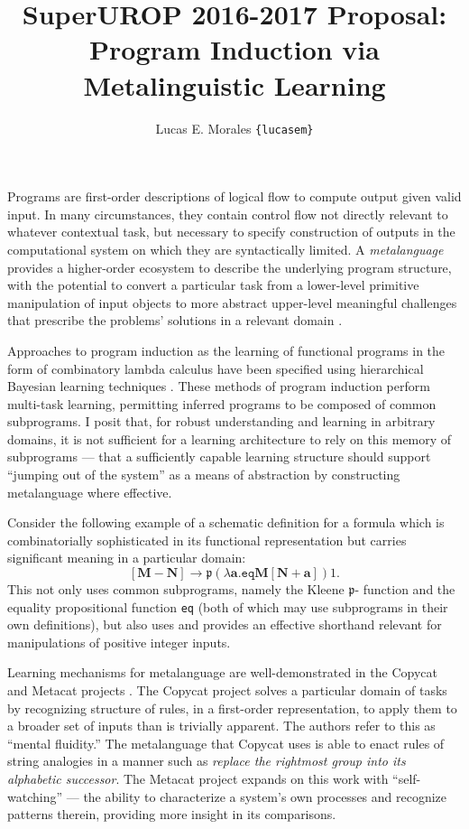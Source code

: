\documentclass[11pt,letterpaper]{article}
\title{{\large SuperUROP 2016-2017 Proposal:}\\
  {\Large Program Induction via Metalinguistic Learning}}
\author{Lucas E. Morales \texttt{\{lucasem\}}}
\date{}
\begin{document}
\maketitle

Programs are first-order descriptions of logical flow to compute output
given valid input. In many circumstances, they contain control flow not
directly relevant to whatever contextual task, but necessary to specify
construction of outputs in the computational system on which they are
syntactically limited. A \emph{metalanguage} provides a higher-order
ecosystem to describe the underlying program structure, with the potential
to convert a particular task from a lower-level primitive manipulation of
input objects to more abstract upper-level meaningful challenges that
prescribe the problems' solutions in a relevant domain \cite{sicp}.

Approaches to program induction as the learning of functional programs in
the form of combinatory lambda calculus have been specified using
hierarchical Bayesian learning techniques \cite{dechter,liang}. These
methods of program induction perform multi-task learning, permitting
inferred programs to be composed of common subprograms. I posit that, for
robust understanding and learning in arbitrary domains, it is not sufficient
for a learning architecture to rely on this memory of subprograms --- that a
sufficiently capable learning structure should support ``jumping out of the
system'' as a means of abstraction by constructing metalanguage where
effective.

Consider the following example of a schematic definition for a formula
\cite{church} which is combinatorially sophisticated in its functional
representation but carries significant meaning in a particular domain:
\[\mathbf{[M-N]} \rightarrow \mathfrak{p} (\lambda\mathbf{a}.
  \texttt{eq} \mathbf{M} \mathbf{[N+a]})1.\]
This not only uses common subprograms, namely the Kleene $\mathfrak{p}$-%
function and the equality propositional function \texttt{eq} (both of which
may use subprograms in their own definitions), but also uses and provides an
effective shorthand relevant for manipulations of positive integer inputs.

Learning mechanisms for metalanguage are well-demonstrated in the Copycat
and Metacat projects \cite{copycat,metacat}. The Copycat project solves a
particular domain of tasks by recognizing structure of rules, in a
first-order representation, to apply them to a broader set of inputs than is
trivially apparent. The authors refer to this as ``mental fluidity.'' The
metalanguage that Copycat uses is able to enact rules of string analogies in
a manner such as \emph{replace the rightmost group into its alphabetic
successor}. The Metacat project expands on this work with ``self-watching''
--- the ability to characterize a system's own processes and recognize
patterns therein, providing more insight in its comparisons.
\end{document}
